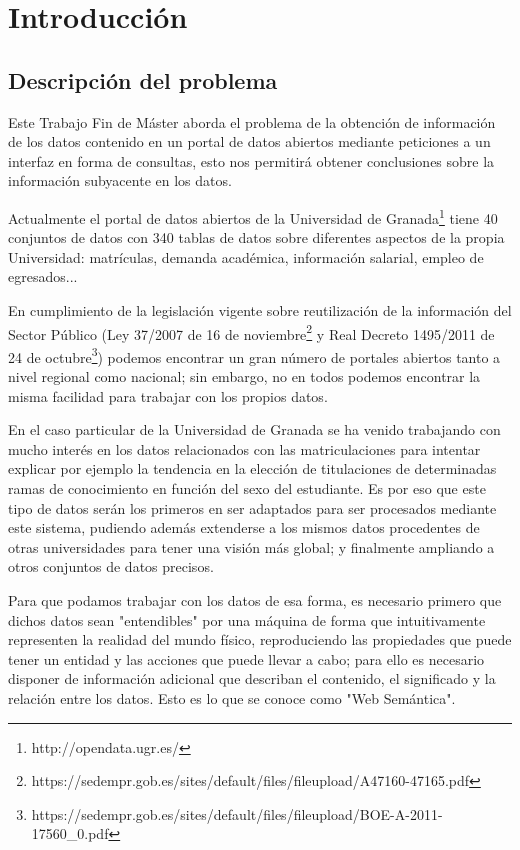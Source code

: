 \chapter{Introducción}

\section{Descripción del problema}

Este Trabajo Fin de Máster aborda el problema de la obtención de información de los datos contenido en un portal de datos abiertos mediante peticiones a un interfaz en forma de consultas, esto nos permitirá obtener conclusiones sobre la información subyacente en los datos.

\bigskip
Actualmente el portal de datos abiertos de la Universidad de Granada\footnote{http://opendata.ugr.es/} tiene 40 conjuntos de datos con 340 tablas de datos sobre diferentes aspectos de la propia Universidad: matrículas, demanda académica, información salarial, empleo de egresados...

\bigskip
En cumplimiento de la legislación vigente sobre reutilización de la información del Sector Público (Ley 37/2007 de 16 de noviembre\footnote{https://sedempr.gob.es/sites/default/files/fileupload/A47160-47165.pdf} y Real Decreto 1495/2011 de 24 de octubre\footnote{https://sedempr.gob.es/sites/default/files/fileupload/BOE-A-2011-17560\_0.pdf}) podemos encontrar un gran número de portales abiertos tanto a nivel regional como nacional; sin embargo, no en todos podemos encontrar la misma facilidad para trabajar con los propios datos.

\bigskip
En el caso particular de la Universidad de Granada se ha venido trabajando con mucho interés en los datos relacionados con las matriculaciones para intentar explicar por ejemplo la tendencia en la elección de titulaciones de determinadas ramas de conocimiento en función del sexo del estudiante. Es por eso que este tipo de datos serán los primeros en ser adaptados para ser procesados mediante este sistema, pudiendo además extenderse a los mismos datos procedentes de otras universidades para tener una visión más global; y finalmente ampliando a otros conjuntos de datos precisos. 

\newpage
Para que podamos trabajar con los datos de esa forma, es necesario primero que dichos datos sean "entendibles" por una máquina de forma que intuitivamente representen la realidad del mundo físico, reproduciendo las propiedades que puede tener un entidad y las acciones que puede llevar a cabo; para ello es necesario disponer de información adicional que describan el contenido, el significado y la relación entre los datos. Esto es lo que se conoce como "Web Semántica".

